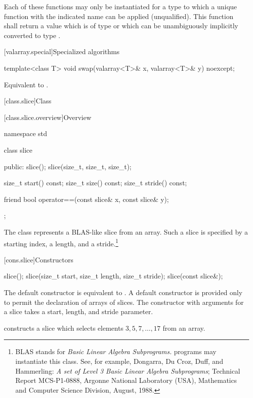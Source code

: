 \begin{itemdescr}
\pnum
\requires
Each of these functions may only be instantiated for a type 
to which a unique function with the indicated name can be applied (unqualified).
This function shall return a value which is of type 
or which can be unambiguously implicitly converted to type .
\end{itemdescr}

[valarray.special]{Specialized algorithms}

%
\begin{itemdecl}
template<class T> void swap(valarray<T>& x, valarray<T>& y) noexcept;
\end{itemdecl}

\begin{itemdescr}
\pnum
\effects Equivalent to .
\end{itemdescr}


[class.slice]{Class }

[class.slice.overview]{Overview}

%
\begin{codeblock}
namespace std {
  class slice {
  public:
    slice();
    slice(size_t, size_t, size_t);

    size_t start() const;
    size_t size() const;
    size_t stride() const;

    friend bool operator==(const slice& x, const slice& y);
  };
}
\end{codeblock}

\pnum
The 
class represents a BLAS-like slice from an array.
Such a slice is specified by a starting index, a length, and a
stride.\footnote{BLAS stands for
\textit{Basic Linear Algebra Subprograms.}
\Cpp{} programs may instantiate this class.
See, for example,
Dongarra, Du Croz, Duff, and Hammerling:
\textit{A set of Level 3 Basic Linear Algebra Subprograms};
Technical Report MCS-P1-0888,
Argonne National Laboratory (USA),
Mathematics and Computer Science Division,
August, 1988.}

[cons.slice]{Constructors}

%
\begin{itemdecl}
slice();
slice(size_t start, size_t length, size_t stride);
slice(const slice&);
\end{itemdecl}

\begin{itemdescr}
\pnum
The default constructor is equivalent to .
A default constructor is provided only to permit the declaration of arrays of slices.
The constructor with arguments for a slice takes a start, length, and stride
parameter.

\pnum
\begin{example}
constructs a slice which selects elements $3, 5, 7, \dotsc, 17$ from an array.
\end{example}
\end{itemdescr}

